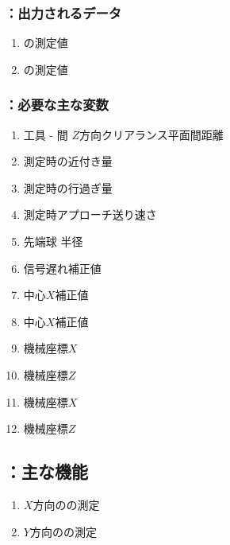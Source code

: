 \subsubsection{\MCenterline：出力されるデータ}
\begin{enumerate}[label*=\sarrow]
\item \CenterlineEndFaceDifAC の測定値
\item \CenterlineEndFaceDifBD の測定値
\end{enumerate}

\clearpage
\subsubsection{\MCenterline：必要な主な変数}
\begin{enumerate}[label*=\sarrow]
\item 工具 - \EndFace 間 $Z$方向クリアランス平面間距離
\item \TouchSensorProbe 測定時の近付き量
\item \TouchSensorProbe 測定時の行過ぎ量
\item \TouchSensorProbe 測定時アプローチ送り速さ
\item \TouchSensorProbe 先端球 半径
\item \TouchSensorProbe 信号遅れ補正値
\item \TouchSensorProbe 中心$X$補正値
\item \TouchSensorProbe 中心$X$補正値
\item \NoOnePalette{} \JigCenter 機械座標$X$
\item \NoOnePalette{} \JigCenter 機械座標$Z$
\item \NoTwoPalette{} \JigCenter 機械座標$X$
\item \NoTwoPalette{} \JigCenter 機械座標$Z$
\end{enumerate}


\subsection{\MCenterline：主な機能}
\begin{enumerate}[label*=\sarrow]
\item $X$方向の\CenterlineEndFaceDif の測定
\item $Y$方向の\CenterlineEndFaceDif の測定
\end{enumerate}


